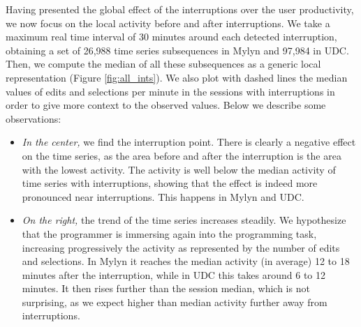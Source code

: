 \documentclass[times]{smrauth}
\begin{document}
Having presented the global effect of the interruptions over the user productivity, we now focus on the local activity before and after interruptions. We take a maximum real time interval of 30 minutes around each detected interruption, obtaining a set of 26,988 time series subsequences in Mylyn and 97,984 in UDC. Then, we compute the median of all these subsequences as a generic local representation (Figure \ref{fig:all_ints}). We also plot with dashed lines the median values of edits and selections per minute in the sessions with interruptions in order to give more context to the observed values.
Below we describe some observations:
\begin{itemize}
\item \textit{In the center,} we find the interruption point. There is clearly a negative effect on the time series, as the area before and after the interruption is the area with the lowest activity. The activity is well below the median activity of time series with interruptions, showing that the effect is indeed more pronounced near interruptions. This happens in Mylyn and UDC.

\item \textit{On the right,} the trend of the time series increases steadily. We hypothesize that the programmer is immersing again into the programming task, increasing progressively the activity as represented by the number of edits and selections. In Mylyn it reaches the median activity (in average) 12 to 18 minutes after the interruption, while in UDC this takes around 6 to 12 minutes. It then rises further than the session median, which is not surprising, as we expect higher than median activity further away from interruptions.


\end{itemize}
\end{document}

